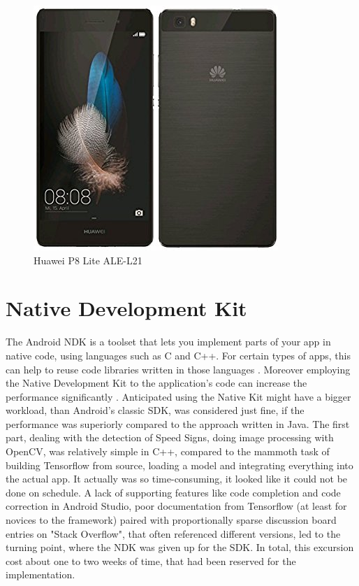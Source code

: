 \begin{figure}[h]
	\centering
	\includegraphics[width=\linewidth]{images/p8lite.jpg}
	\caption{Huawei P8 Lite ALE-L21}\label{fig:p8lite}
	\endminipage\hfill
\end{figure}

\section{Native Development Kit}
The Android NDK is a toolset that lets you implement parts of your app in native code, using languages such as C and C++. For certain types of apps, this can help to reuse code libraries written in those languages \cite{androidndk}. Moreover employing the Native Development Kit to the application's code can increase the performance significantly  \cite{ndkspeed}. Anticipated using the Native Kit might have a bigger workload, than Android's classic SDK, was considered just fine, if the performance was superiorly compared to the approach written in Java. \newline
The first part, dealing with the detection of Speed Signs, doing image processing with OpenCV,  was relatively simple in C++, compared to the mammoth task of building Tensorflow from source, loading a model and integrating everything into the actual app. It actually was so time-consuming, it looked like it could not be done on schedule. A lack of supporting features like code completion and code correction in Android Studio, poor documentation from Tensorflow (at least for novices to the framework) paired with proportionally sparse discussion board entries on "Stack Overflow", that often referenced different versions, led to the turning point, where the NDK was given up for the SDK. In total, this excursion cost about one to two weeks of time, that had been reserved for the implementation. 

